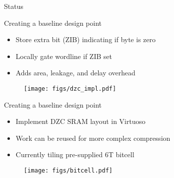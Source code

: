 \documentclass{beamer}
\author{Albert Magyar, David Biancolin, Jack Koenig}
\date{\today}
\newcommand{\gwidth}[0]{0.7\textwidth}
\begin{document}
\begin{frame}
  \titlepage
\end{frame}

\begin{frame}{Status}
\end{frame}

\begin{frame}{Creating a baseline design point}
  \begin{itemize}
  \item Store extra bit (ZIB) indicating if byte is zero
  \item Locally gate wordline if ZIB set
  \item Adds area, leakage, and delay overhead
  \end{itemize}
    \begin{figure}
    \centering
    \texttt{[image: figs/dzc\_impl.pdf]}
  \end{figure}
\end{frame}

\begin{frame}{Creating a baseline design point}
  \begin{itemize}
  \item Implement DZC SRAM layout in Virtuoso
  \item Work can be reused for more complex compression
  \item Currently tiling pre-supplied 6T bitcell
  \end{itemize}
    \begin{figure}
    \centering
    \texttt{[image: figs/bitcell.pdf]}
  \end{figure}
\end{frame}
\end{document}
